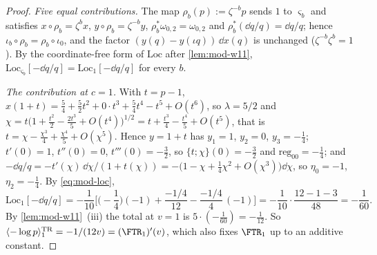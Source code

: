 \begin{proof}
\emph{Five equal contributions.} The map $\rho_b(p):=\zeta^{-b}p$ sends $1$ to $\varsigma_b$ and satisfies $x\circ\rho_b=\zeta^bx$, $y\circ\rho_b=\zeta^{-b}y$, $\rho_b^*\omega_{0,2}=\omega_{0,2}$ and $\rho_b^*(\dd q/q)=\dd q/q$; hence $\iota_b\circ\rho_b=\rho_b\circ\iota_0$, and the factor $(y(q)-y(\iota q))\,\dd x(q)$ is unchanged ($\zeta^{-b}\zeta^b=1$). By the coordinate-free form of $\mathrm{Loc}$ after \cref{lem:mod-w11}, $\mathrm{Loc}_{\varsigma_b}[-\dd q/q]=\mathrm{Loc}_1[-\dd q/q]$ for every $b$.

\emph{The contribution at $c=1$.} With $t=p-1$, $x(1+t)=\frac54+\frac52t^2+0\cdot t^3+\frac54t^4-t^5+O(t^6)$, so $\lambda=5/2$ and $\chi=t\big(1+\frac{t^2}2-\frac{2t^3}5+O(t^4)\big)^{1/2}=t+\frac{t^3}4-\frac{t^4}5+O(t^5)$, that is $t=\chi-\frac{\chi^3}4+\frac{\chi^4}5+O(\chi^5)$. Hence $y=1+t$ has $y_1=1$, $y_2=0$, $y_3=-\frac14$; $t'(0)=1$, $t''(0)=0$, $t'''(0)=-\frac32$, so $\{t;\chi\}(0)=-\frac32$ and $\mathrm{reg}_{00}=-\frac14$; and $-\dd q/q=-t'(\chi)\,\dd\chi/(1+t(\chi))=-\big(1-\chi+\frac14\chi^2+O(\chi^3)\big)\dd\chi$, so $\eta_0=-1$, $\eta_2=-\frac14$. By \eqref{eq:mod-loc},
\[
\mathrm{Loc}_1[-\dd q/q]=-\frac1{10}\Big[\Big(-\frac14\Big)(-1)+\frac{-1/4}{12}-\frac{-1/4}{4}\,(-1)\Big]=-\frac1{10}\cdot\frac{12-1-3}{48}=-\frac1{60}.
\]
By \cref{lem:mod-w11}~(iii) the total at $v=1$ is $5\cdot(-\frac1{60})=-\frac1{12}$. So $\langle-\log p\rangle^{\mathrm{TR}}_1=-1/(12v)=(\FTR_1)'(v)$, which also fixes $\FTR_1$ up to an additive constant.
\end{proof}



